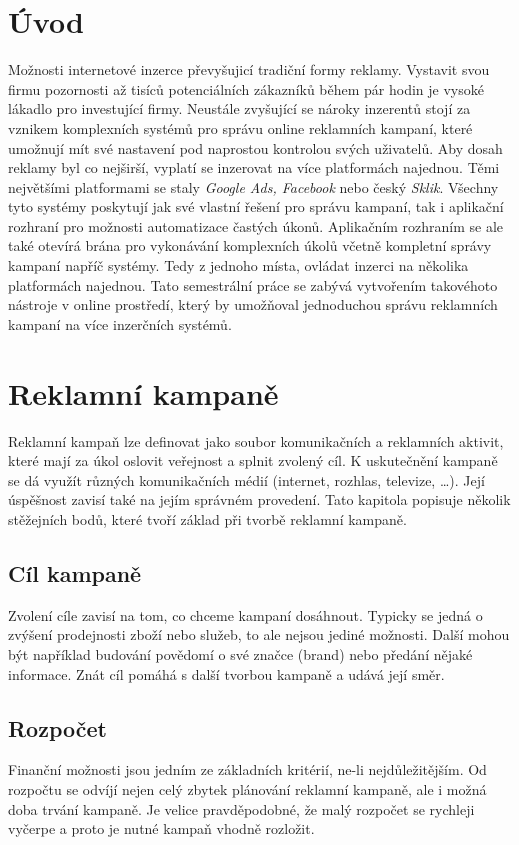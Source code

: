 \documentclass[czech,bachelor]{diploma}
\begin{document}
\MakeTitlePages

\chapter{Úvod}
Možnosti internetové inzerce převyšujicí tradiční formy reklamy. Vystavit svou firmu pozornosti až tisíců potenciálních zákazníků během pár hodin je vysoké lákadlo pro investující firmy. Neustále zvyšující se nároky inzerentů stojí za vznikem komplexních systémů
pro správu online reklamních kampaní, které umožnují mít své nastavení pod naprostou kontrolou svých uživatelů. Aby dosah reklamy byl co nejširší, vyplatí se inzerovat na více platformách najednou. Těmi největšími platformami se staly 
\emph{Google Ads, Facebook} nebo český \emph{Sklik}. Všechny tyto systémy poskytují jak své vlastní řešení pro správu kampaní, tak i aplikační rozhraní pro možnosti automatizace častých úkonů.
Aplikačním rozhraním se ale také otevírá brána pro vykonávání komplexních úkolů včetně kompletní správy kampaní napříč systémy. Tedy z jednoho místa, ovládat inzerci na několika platformách najednou.
Tato semestrální práce se zabývá vytvořením takovéhoto nástroje v online prostředí, který by umožňoval jednoduchou správu reklamních kampaní na více inzerčních systémů. 


\chapter{Reklamní kampaně}
Reklamní kampaň lze definovat jako soubor komunikačních a reklamních aktivit, které mají za úkol oslovit veřejnost a splnit zvolený cíl. K uskutečnění kampaně se dá využít různých komunikačních
médií (internet, rozhlas, televize, \ldots). Její úspěšnost zavisí také na jejím správném provedení. Tato kapitola popisuje několik stěžejních bodů, které tvoří základ při tvorbě reklamní kampaně.


\section{Cíl kampaně}
Zvolení cíle zavisí na tom, co chceme kampaní dosáhnout. Typicky se jedná o zvýšení prodejnosti zboží nebo služeb, to ale nejsou jediné možnosti. Další mohou být například budování
povědomí o své značce (brand) nebo předání nějaké informace. Znát cíl pomáhá s další tvorbou kampaně a udává její směr.

\section{Rozpočet}
Finanční možnosti jsou jedním ze základních kritérií, ne-li nejdůležitějším. Od rozpočtu se odvíjí nejen celý zbytek plánování reklamní kampaně, ale i možná 
doba trvání kampaně. Je velice pravděpodobné, že malý rozpočet se rychleji vyčerpe a proto je nutné kampaň vhodně rozložit.
\end{document}
